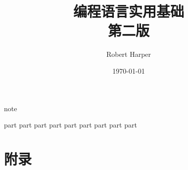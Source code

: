 \documentclass{ctexbook}
\title{{\Huge\textbf{编程语言实用基础}} \\第二版}
\author{Robert Harper}
\date{\today}
\begin{document}
\frontmatter
\maketitle

{note}

\setcounter{tocdepth}{1}
\tableofcontents

\newpage
\mainmatter

{part}
{part}
{part}
{part}
{part}
{part}
{part}
{part}
{part}

\backmatter
\part{附录}
\appendix
\printglossary[title=术语]
\end{document}
